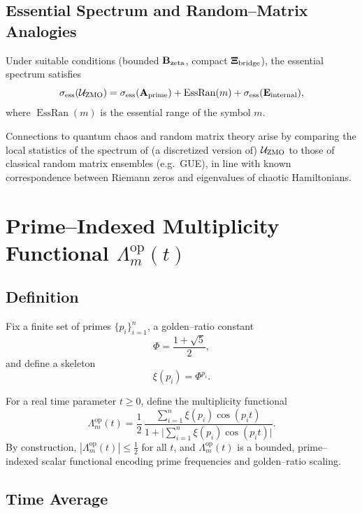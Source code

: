 \documentclass[11pt]{article}
\begin{document}
\subsection{Essential Spectrum and Random–Matrix Analogies}

Under suitable conditions (bounded \(\mathbf{B}_{\rm zeta}\), compact \(\mathbf{\Xi}_{\rm bridge}\)), the essential spectrum satisfies
\begin{equation}
  \sigma_{\rm ess}(\mathcal{U}_{\rm ZMO})
  = \sigma_{\rm ess}(\mathbf{A}_{\rm prime}) + \operatorname{EssRan}(m) + \sigma_{\rm ess}(\mathbf{E}_{\rm internal}),
\end{equation}
where \(\operatorname{EssRan}(m)\) is the essential range of the symbol \(m\).\cite{RZQC}

Connections to quantum chaos and random matrix theory arise by comparing the local statistics of the spectrum of (a discretized version of) \(\mathcal{U}_{\rm ZMO}\) to those of classical random matrix ensembles (e.g.\ GUE), in line with known correspondence between Riemann zeros and eigenvalues of chaotic Hamiltonians.\cite{RZQC,KeatingQC,RandomMatrixQChaos}

\section{Prime–Indexed Multiplicity Functional \texorpdfstring{$\Lambda_m^{\mathrm{op}}(t)$}{Lambda\_m^{op}(t)}}

\subsection{Definition}

Fix a finite set of primes \(\{p_i\}_{i=1}^n\), a golden–ratio constant
\[
  \Phi = \frac{1 + \sqrt{5}}{2},
\]
and define a skeleton
\[
  \xi(p_i) = \Phi^{p_i}.
\]

For a real time parameter \(t \ge 0\), define the multiplicity functional
\begin{equation}
  \Lambda_m^{\mathrm{op}}(t)
  = \frac{1}{2} \,\frac{\sum_{i=1}^n \xi(p_i)\cos(p_i t)}{1 + \bigl|\sum_{i=1}^n \xi(p_i)\cos(p_i t)\bigr|}.
\end{equation}
By construction, \(|\Lambda_m^{\mathrm{op}}(t)| \le \tfrac12\) for all \(t\), and \(\Lambda_m^{\mathrm{op}}(t)\) is a bounded, prime–indexed scalar functional encoding prime frequencies and golden–ratio scaling.

\subsection{Time Average}
\end{document}
